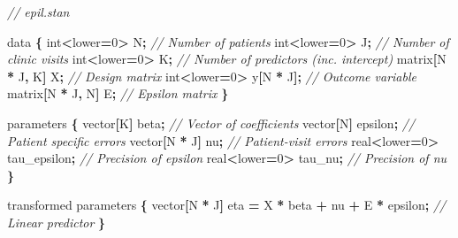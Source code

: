 \documentclass[a4paper, nobind]{templates/ociamthesis}
\newenvironment{Shaded}{\begin{snugshade}}{\end{snugshade}}
\newcommand{\CommentTok}[1]{\textcolor[rgb]{0.56,0.35,0.01}{\textit{#1}}}
\newcommand{\DataTypeTok}[1]{\textcolor[rgb]{0.13,0.29,0.53}{#1}}
\newcommand{\DecValTok}[1]{\textcolor[rgb]{0.00,0.00,0.81}{#1}}
\newcommand{\NormalTok}[1]{#1}
\newcommand{\OperatorTok}[1]{\textcolor[rgb]{0.81,0.36,0.00}{\textbf{#1}}}
\renewenvironment{Shaded}
{
  \vspace{10pt}%
  \begin{snugshade}%
}{%
  \end{snugshade}%
  \vspace{8pt}%
}
\begin{document}
\begin{Shaded}
\begin{Highlighting}[]
\CommentTok{// epil.stan}

\NormalTok{data }\OperatorTok{\{}
  \DataTypeTok{int}\OperatorTok{\textless{}}\NormalTok{lower}\OperatorTok{=}\DecValTok{0}\OperatorTok{\textgreater{}}\NormalTok{ N}\OperatorTok{;}            \CommentTok{// Number of patients}
  \DataTypeTok{int}\OperatorTok{\textless{}}\NormalTok{lower}\OperatorTok{=}\DecValTok{0}\OperatorTok{\textgreater{}}\NormalTok{ J}\OperatorTok{;}            \CommentTok{// Number of clinic visits}
  \DataTypeTok{int}\OperatorTok{\textless{}}\NormalTok{lower}\OperatorTok{=}\DecValTok{0}\OperatorTok{\textgreater{}}\NormalTok{ K}\OperatorTok{;}            \CommentTok{// Number of predictors (inc. intercept)}
\NormalTok{  matrix}\OperatorTok{[}\NormalTok{N }\OperatorTok{*}\NormalTok{ J}\OperatorTok{,}\NormalTok{ K}\OperatorTok{]}\NormalTok{ X}\OperatorTok{;}        \CommentTok{// Design matrix}
  \DataTypeTok{int}\OperatorTok{\textless{}}\NormalTok{lower}\OperatorTok{=}\DecValTok{0}\OperatorTok{\textgreater{}}\NormalTok{ y}\OperatorTok{[}\NormalTok{N }\OperatorTok{*}\NormalTok{ J}\OperatorTok{];}     \CommentTok{// Outcome variable}
\NormalTok{  matrix}\OperatorTok{[}\NormalTok{N }\OperatorTok{*}\NormalTok{ J}\OperatorTok{,}\NormalTok{ N}\OperatorTok{]}\NormalTok{ E}\OperatorTok{;}        \CommentTok{// Epsilon matrix}
\OperatorTok{\}}

\NormalTok{parameters }\OperatorTok{\{}
\NormalTok{  vector}\OperatorTok{[}\NormalTok{K}\OperatorTok{]}\NormalTok{ beta}\OperatorTok{;}            \CommentTok{// Vector of coefficients}
\NormalTok{  vector}\OperatorTok{[}\NormalTok{N}\OperatorTok{]}\NormalTok{ epsilon}\OperatorTok{;}         \CommentTok{// Patient specific errors}
\NormalTok{  vector}\OperatorTok{[}\NormalTok{N }\OperatorTok{*}\NormalTok{ J}\OperatorTok{]}\NormalTok{ nu}\OperatorTok{;}          \CommentTok{// Patient{-}visit errors}
\NormalTok{  real}\OperatorTok{\textless{}}\NormalTok{lower}\OperatorTok{=}\DecValTok{0}\OperatorTok{\textgreater{}}\NormalTok{ tau\_epsilon}\OperatorTok{;} \CommentTok{// Precision of epsilon}
\NormalTok{  real}\OperatorTok{\textless{}}\NormalTok{lower}\OperatorTok{=}\DecValTok{0}\OperatorTok{\textgreater{}}\NormalTok{ tau\_nu}\OperatorTok{;}      \CommentTok{// Precision of nu}
\OperatorTok{\}}

\NormalTok{transformed parameters }\OperatorTok{\{}
\NormalTok{  vector}\OperatorTok{[}\NormalTok{N }\OperatorTok{*}\NormalTok{ J}\OperatorTok{]}\NormalTok{ eta }\OperatorTok{=}\NormalTok{ X }\OperatorTok{*}\NormalTok{ beta }\OperatorTok{+}\NormalTok{ nu }\OperatorTok{+}\NormalTok{ E }\OperatorTok{*}\NormalTok{ epsilon}\OperatorTok{;}  \CommentTok{// Linear predictor}
\OperatorTok{\}}


\end{Highlighting}
\end{Shaded}
\end{document}
